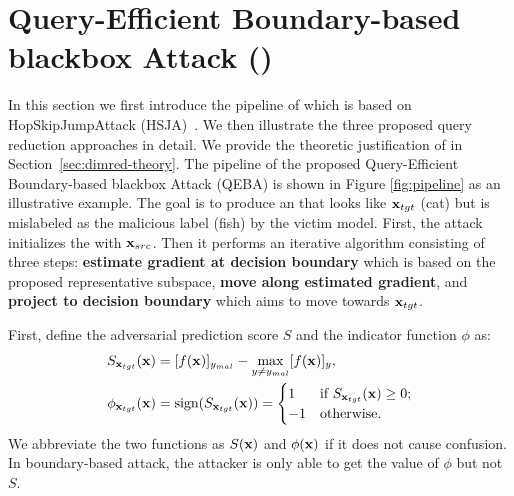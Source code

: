 
\section{Query-Efficient Boundary-based blackbox Attack (\name)}
\label{sec:subspaces}
In this section we first introduce the pipeline of \name which is based on HopSkipJumpAttack (HSJA)~\cite{chen2019hopskipjumpattack}. We then illustrate the three proposed query reduction approaches in detail. We provide the theoretic justification of \name in Section~\ref{sec:dimred-theory}.
The pipeline of the proposed Query-Efficient Boundary-based blackbox Attack (QEBA) is shown in Figure \ref{fig:pipeline} as an illustrative example. The goal is to produce an \advimage that looks like ${\bf x}_{tgt}$ (cat) but is mislabeled as the malicious label (fish) by the victim model.
First, the attack initializes the \advimage with ${\bf x}_{src}$.
Then it performs an iterative algorithm consisting of three steps: \textbf{estimate gradient at decision boundary} which is based on the proposed representative subspace, \textbf{move along estimated gradient}, and \textbf{project to decision boundary} which aims to move towards ${\bf x}_{tgt}$.

First, define the adversarial prediction score $S$ and the indicator function $\phi$ as:
\begin{align}
    S_{{\bf x}_{tgt}}({\bf x}) &= [f({\bf x})]_{y_{mal}} - \max_{y \neq y_{mal}} [f({\bf x})]_y,\\
    \phi_{{\bf x}_{tgt}}({\bf x}) &= \text{sign}(S_{{\bf x}_{tgt}}({\bf x})) =
    \begin{cases}
    1 & \text{if } S_{{\bf x}_{tgt}}({\bf x})\geq 0;\\
    -1 & \text{otherwise}.
    \end{cases}
\end{align}
We abbreviate the two functions as $S({\bf x})$ and $\phi({\bf x})$ if it does not cause confusion. In boundary-based attack, the attacker is only able to get the value of $\phi$ but not $S$.

